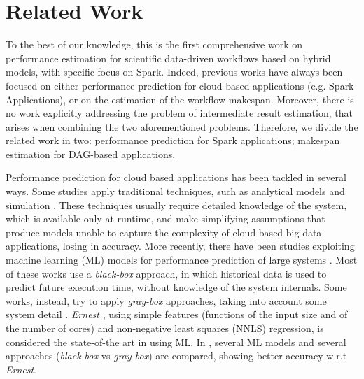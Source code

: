\documentclass[a4paper, 10pt, conference]{ieeeconf}      %
\begin{document}
\section{Related Work}
\label{section:related_work}
To the best of our knowledge, this is the first comprehensive work on performance estimation for scientific data-driven workflows based on hybrid models, with specific focus on Spark. Indeed, previous works have always been focused on either performance prediction for cloud-based applications (e.g. Spark Applications), or on the estimation of the workflow makespan. Moreover, there is no work explicitly addressing the problem of intermediate result estimation, that arises when combining the two aforementioned problems. 
Therefore, we divide the related work in two: performance prediction for Spark applications; makespan estimation for DAG-based applications. 

Performance prediction for cloud based applications has been tackled in several ways. 
Some studies apply traditional techniques, such as analytical models \cite{nelson1988approximate, mak, ardagna1, liang2000performance} and simulation \cite{bertoli2009jmt}. These techniques usually require detailed knowledge of the system, which is available only at runtime, and make  simplifying assumptions that  produce models unable to capture the complexity of cloud-based big data applications, losing in accuracy. More recently, there have been studies exploiting machine learning (ML) models for performance prediction of large systems \cite{ernest, MUSTAFA20183767, pan2017hemingway, alipourfard2017cherrypick, ARDAGNA2019, lattuada2019gray}.
Most of these works use a \textit{black-box} approach, in which historical data is used to predict future execution time, without knowledge of the system internals. Some works, instead, try to apply \textit{gray-box} approaches, taking into account some system detail \cite{ARDAGNA2019, lattuada2019gray, shon2008scientific}. 
\textit{Ernest} \cite{ernest}, using simple features (functions of the input size and of the number of cores) and non-negative least squares (NNLS) regression, is considered the state-of-the art in using ML. In \cite{ARDAGNA2019}, several ML models and several approaches (\textit{black-box} vs \textit{gray-box}) are compared, showing better accuracy w.r.t \textit{Ernest}.
\end{document}
